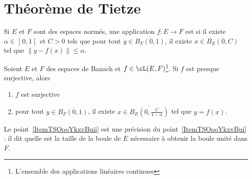 \section{Théorème de Tietze}

\begin{definition}
	Si \( E\) et \( F\) sont des espaces normés, une application \( f\colon E\to F\) est  si il existe \( \alpha\in\mathopen] 0 , 1 \mathclose[\) et \( C>0\) tels que pour tout \( y\in \overline{ B_F(0,1) }\), il existe \( x\in\overline{ B_E(0,C) }\) tel que \( \| y-f(x) \|\leq \alpha\).
\end{definition}

\begin{lemma}   \label{LemBQLooRXhJzK}
	Soient \( E\) et \( F\) des espaces de Banach et \( f\in\cL(E,F)\)\footnote{L'ensemble des applications linéaires continues}. Si \( f\) est presque surjective, alors
	\begin{enumerate}
		\item   \label{ItemTSOooYkxvBui}
		      \( f\) est surjective
		      \item\label{ItemTSOooYkxvBuii}
		      pour tout \( y\in \overline{ B_F(0,1) }\), il existe \( x\in\overline{ B_E(0,\frac{ C }{ 1-\alpha }) }\) tel que \( y=f(x)\).
	\end{enumerate}
\end{lemma}
Le point~\ref{ItemTSOooYkxvBuii} est une précision du point~\ref{ItemTSOooYkxvBui} : il dit quelle est la taille de la boule de \( E\) nécessaire à obtenir la boule unité dans \( F\).

